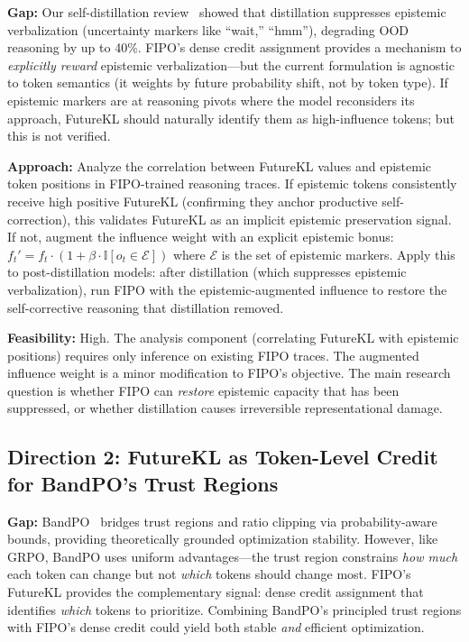 \documentclass[11pt]{article}
\begin{document}
\textbf{Gap:} Our self-distillation review~\cite{selfdistill} showed that distillation suppresses epistemic verbalization (uncertainty markers like ``wait,'' ``hmm''), degrading OOD reasoning by up to 40\%. FIPO's dense credit assignment provides a mechanism to \textit{explicitly reward} epistemic verbalization---but the current formulation is agnostic to token semantics (it weights by future probability shift, not by token type). If epistemic markers are at reasoning pivots where the model reconsiders its approach, FutureKL should naturally identify them as high-influence tokens; but this is not verified.

\textbf{Approach:} Analyze the correlation between FutureKL values and epistemic token positions in FIPO-trained reasoning traces. If epistemic tokens consistently receive high positive FutureKL (confirming they anchor productive self-correction), this validates FutureKL as an implicit epistemic preservation signal. If not, augment the influence weight with an explicit epistemic bonus: $f_t' = f_t \cdot (1 + \beta \cdot \mathbb{I}[o_t \in \mathcal{E}])$ where $\mathcal{E}$ is the set of epistemic markers. Apply this to post-distillation models: after distillation (which suppresses epistemic verbalization), run FIPO with the epistemic-augmented influence to restore the self-corrective reasoning that distillation removed.

\textbf{Feasibility:} High. The analysis component (correlating FutureKL with epistemic positions) requires only inference on existing FIPO traces. The augmented influence weight is a minor modification to FIPO's objective. The main research question is whether FIPO can \textit{restore} epistemic capacity that has been suppressed, or whether distillation causes irreversible representational damage.

\subsection{Direction 2: FutureKL as Token-Level Credit for BandPO's Trust Regions}

\textbf{Gap:} BandPO~\cite{bandpo} bridges trust regions and ratio clipping via probability-aware bounds, providing theoretically grounded optimization stability. However, like GRPO, BandPO uses uniform advantages---the trust region constrains \textit{how much} each token can change but not \textit{which} tokens should change most. FIPO's FutureKL provides the complementary signal: dense credit assignment that identifies \textit{which} tokens to prioritize. Combining BandPO's principled trust regions with FIPO's dense credit could yield both stable \textit{and} efficient optimization.
\end{document}
